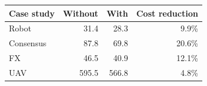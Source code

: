 \begin{tabular}{@{}lrrr@{}}
\toprule
Case study & Without & With & Cost reduction\\
\midrule
Robot & 31.4 & 28.3 & 9.9\%\\
Consensus & 87.8 & 69.8 & 20.6\%\\
FX & 46.5 & 40.9 & 12.1\%\\
UAV & 595.5 & 566.8 & 4.8\%\\
\bottomrule
\end{tabular}
